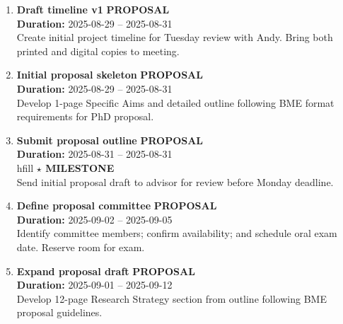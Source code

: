 \documentclass[a4paper]{article}
\newcommand{\cellcolor}[2]{\colorbox{#1}{#2}}
\begin{document}
\begin{enumerate}[leftmargin=0.3cm, itemsep=0.3em, parsep=0.1em, topsep=0.1em]

    \item \textcolor{researchcore}{\textbf{\Large Draft timeline v1}}
          \hfill \cellcolor{researchcore!15}{\textbf{\small PROPOSAL}}
          \\ \textcolor{black!60}{\textbf{Duration:} 2025-08-29 -- 2025-08-31} \\ \textcolor{black!80}{\small Create initial project timeline for Tuesday review with Andy. Bring both printed and digital copies to meeting.}

    \item \textcolor{researchcore}{\textbf{\Large Initial proposal skeleton}}
          \hfill \cellcolor{researchcore!15}{\textbf{\small PROPOSAL}}
          \\ \textcolor{black!60}{\textbf{Duration:} 2025-08-29 -- 2025-08-31} \\ \textcolor{black!80}{\small Develop 1-page Specific Aims and detailed outline following BME format requirements for PhD proposal.}

    \item \textcolor{researchcore}{\textbf{\Large Submit proposal outline}}
          \hfill \cellcolor{researchcore!15}{\textbf{\small PROPOSAL}}
          \\ \textcolor{black!60}{\textbf{Duration:} 2025-08-31 -- 2025-08-31} \\hfill \textcolor{milestone}{\textbf{$\star$ MILESTONE}} \\ \textcolor{black!80}{\small Send initial proposal draft to advisor for review before Monday deadline.}

    \item \textcolor{researchcore}{\textbf{\Large Define proposal committee}}
          \hfill \cellcolor{researchcore!15}{\textbf{\small PROPOSAL}}
          \\ \textcolor{black!60}{\textbf{Duration:} 2025-09-02 -- 2025-09-05} \\ \textcolor{black!80}{\small Identify committee members; confirm availability; and schedule oral exam date. Reserve room for exam.}

    \item \textcolor{researchcore}{\textbf{\Large Expand proposal draft}}
          \hfill \cellcolor{researchcore!15}{\textbf{\small PROPOSAL}}
          \\ \textcolor{black!60}{\textbf{Duration:} 2025-09-01 -- 2025-09-12} \\ \textcolor{black!80}{\small Develop 12-page Research Strategy section from outline following BME proposal guidelines.}


\end{enumerate}
\end{document}
